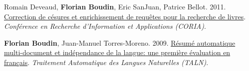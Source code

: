 \item 
Romain Deveaud, \textbf{Florian Boudin}, Eric SanJuan, Patrice Bellot.
2011.
\href{https://asso-aria.org/coria/2011/89.pdf}{Correction de césures et enrichissement de requêtes pour la recherche de livres}.
\textit{Conférence en Recherche d’Information et Applications (CORIA)}.
\label{deveaud-etal-2011-correction}

\item 
\textbf{Florian Boudin}, Juan-Manuel Torres-Moreno.
2009.
\href{https://aclanthology.org/2009.jeptalnrecital-court.35.pdf}{Résumé automatique multi-document et indépendance de la langue: une première évaluation en français}.
\textit{Traitement Automatique des Langues Naturelles (TALN)}.
\label{boudin-torres-moreno-2009-resume}